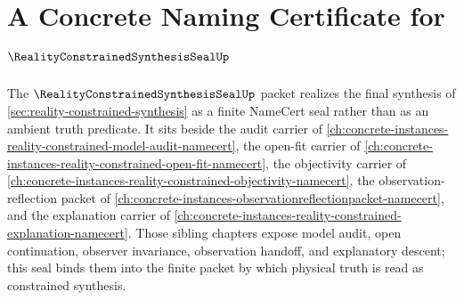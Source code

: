 \chapter{A Concrete Naming Certificate for $\RealityConstrainedSynthesisSealUp$}
\label{ch:concrete-instances-realityconstrainedsynthesisseal-namecert}

The $\RealityConstrainedSynthesisSealUp$ packet realizes the final synthesis of \autoref{sec:reality-constrained-synthesis} as a finite NameCert seal rather than as an ambient truth predicate. It sits beside the audit carrier of \autoref{ch:concrete-instances-reality-constrained-model-audit-namecert}, the open-fit carrier of \autoref{ch:concrete-instances-reality-constrained-open-fit-namecert}, the objectivity carrier of \autoref{ch:concrete-instances-reality-constrained-objectivity-namecert}, the observation-reflection packet of \autoref{ch:concrete-instances-observationreflectionpacket-namecert}, and the explanation carrier of \autoref{ch:concrete-instances-reality-constrained-explanation-namecert}. Those sibling chapters expose model audit, open continuation, observer invariance, observation handoff, and explanatory descent; this seal binds them into the finite packet by which physical truth is read as constrained synthesis.


